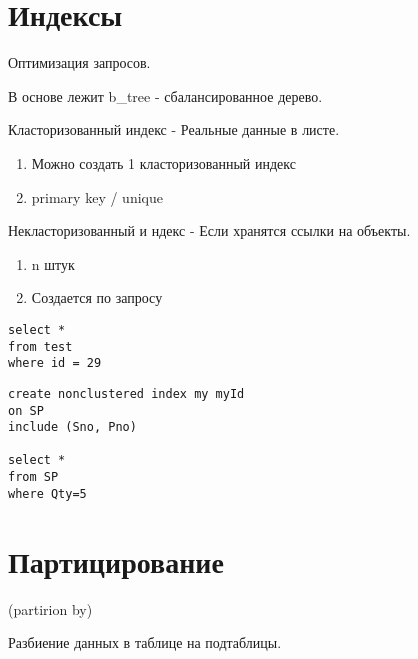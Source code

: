 \section{Индексы}

Оптимизация запросов.

В основе лежит b\_tree - сбалансированное дерево.

Класторизованный индекс - Реальные данные в листе.

\begin{enumerate}
	\item Можно создать 1 класторизованный индекс
	\item primary key / unique
\end{enumerate}

Некласторизованный и ндекс - Если хранятся ссылки на объекты.

\begin{enumerate}
	\item n штук
	\item Создается по запросу
\end{enumerate}


\begin{lstlisting}[label=some-code,caption=Индекс]
select *
from test
where id = 29
\end{lstlisting}

\begin{lstlisting}[label=some-code,caption=Индекс. Создание]
create nonclustered index my myId
on SP
include (Sno, Pno)

select *
from SP
where Qty=5
\end{lstlisting}

\section{Партицирование}

 (partirion by)

Разбиение данных в таблице на подтаблицы.